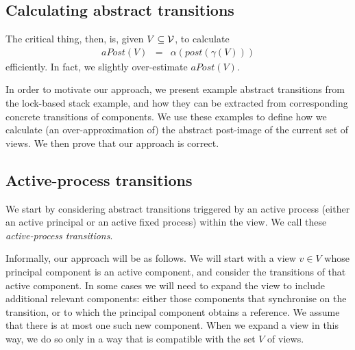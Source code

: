 \subsection{Calculating abstract transitions}

The critical thing, then, is, given $V \subseteq \mathcal{V}$, to calculate
\begin{eqnarray*}
aPost(V) & = & \alpha(post(\gamma(V)))
\end{eqnarray*}
efficiently.  In fact, we slightly over-estimate $aPost(V)$.


In order to motivate our approach, we present example abstract transitions
from the lock-based stack example, and how they can be extracted from
corresponding concrete transitions of components.  We use these examples to
define how we calculate (an over-approximation of) the abstract post-image of
the current set of views.  We then prove that our approach is correct.



\subsection{Active-process transitions}

We start by considering abstract transitions triggered by an active process
(either an active principal or an active fixed process) within the view.  We
call these \emph{active-process transitions}.

Informally, our approach will be as follows.  We will start with a view $v \in
V$ whose principal component is an active component, and consider the
transitions of that active component.  In some cases we will need to expand
the view to include additional relevant components: either those components
that synchronise on the transition, or to which the principal component
obtains a reference.  We assume that there is at most one such new component.
When we expand a view in this way, we do so only in a way that is compatible
with the set $V$ of views.


